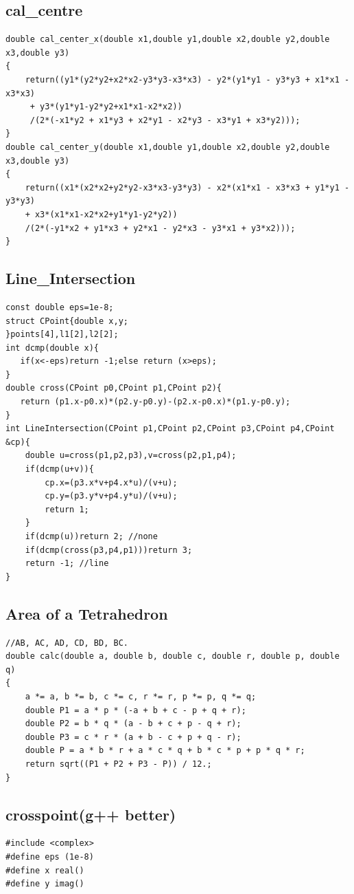 \documentclass[a4paper]{article}
\begin{document}
\begin{CJK*}{UTF8}{gbsn}
\begin{multicols}{3}
\begin{flushleft}
\subsection{cal\_centre}
\begin{lstlisting}
double cal_center_x(double x1,double y1,double x2,double y2,double x3,double y3)
{
    return((y1*(y2*y2+x2*x2-y3*y3-x3*x3) - y2*(y1*y1 - y3*y3 + x1*x1 - x3*x3)
     + y3*(y1*y1-y2*y2+x1*x1-x2*x2))
     /(2*(-x1*y2 + x1*y3 + x2*y1 - x2*y3 - x3*y1 + x3*y2)));
}
double cal_center_y(double x1,double y1,double x2,double y2,double x3,double y3)
{
    return((x1*(x2*x2+y2*y2-x3*x3-y3*y3) - x2*(x1*x1 - x3*x3 + y1*y1 - y3*y3)
    + x3*(x1*x1-x2*x2+y1*y1-y2*y2))
    /(2*(-y1*x2 + y1*x3 + y2*x1 - y2*x3 - y3*x1 + y3*x2)));
}
\end{lstlisting}

\subsection{Line\_Intersection}
\begin{lstlisting}
const double eps=1e-8;
struct CPoint{double x,y;
}points[4],l1[2],l2[2];
int dcmp(double x){
   if(x<-eps)return -1;else return (x>eps);
}
double cross(CPoint p0,CPoint p1,CPoint p2){
   return (p1.x-p0.x)*(p2.y-p0.y)-(p2.x-p0.x)*(p1.y-p0.y);
}
int LineIntersection(CPoint p1,CPoint p2,CPoint p3,CPoint p4,CPoint &cp){
    double u=cross(p1,p2,p3),v=cross(p2,p1,p4);
    if(dcmp(u+v)){
        cp.x=(p3.x*v+p4.x*u)/(v+u);
        cp.y=(p3.y*v+p4.y*u)/(v+u);
        return 1;
    }
    if(dcmp(u))return 2; //none
    if(dcmp(cross(p3,p4,p1)))return 3;
    return -1; //line
}
\end{lstlisting}



\subsection{Area of a Tetrahedron}
\begin{lstlisting}
//AB, AC, AD, CD, BD, BC.
double calc(double a, double b, double c, double r, double p, double q)
{
    a *= a, b *= b, c *= c, r *= r, p *= p, q *= q;
    double P1 = a * p * (-a + b + c - p + q + r);
    double P2 = b * q * (a - b + c + p - q + r);
    double P3 = c * r * (a + b - c + p + q - r);
    double P = a * b * r + a * c * q + b * c * p + p * q * r;
    return sqrt((P1 + P2 + P3 - P)) / 12.;
}
\end{lstlisting}


\subsection{crosspoint(g++ better)}
\begin{lstlisting}
#include <complex>
#define eps (1e-8)
#define x real()
#define y imag()


\end{lstlisting}
\end{flushleft}
\end{multicols}
\end{CJK*}
\end{document}
